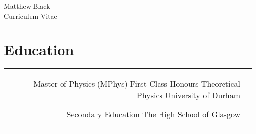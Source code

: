 \documentclass[10pt]{article} %
\begin{document}
\begin{paracol}{2} %


\parbox[top][0.12\textheight][c]{\linewidth}{ %
	\vspace{-0.04\textheight} %
	\centering %
	{\sffamily\Huge Matthew Black}\\\medskip %
	{\Huge\color{headings}\cvtextfont Curriculum Vitae}
}

\section{Education}





\begin{supertabular}{rp{6.7cm}} %


	{Master of Physics (MPhys)} %
    {First Class Honours}
	{Theoretical Physics} %
	{University of Durham} %


	{Secondary Education} %
	{} %
    {} %
    {The High School of Glasgow} %


\end{supertabular}
\end{paracol}
\end{document}
